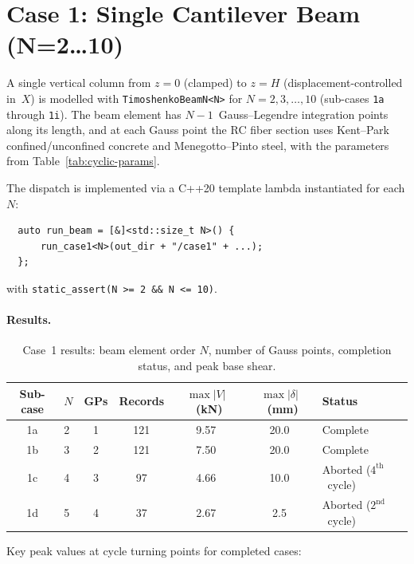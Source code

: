 \section{Case 1: Single Cantilever Beam (N=2\ldots10)}
\label{sec:cyclic-case1}

A single vertical column from $z = 0$ (clamped) to $z = H$
(displacement-controlled in~$X$) is modelled with
\texttt{TimoshenkoBeamN<N>} for $N = 2, 3, \ldots, 10$
(sub-cases \texttt{1a} through \texttt{1i}).  The beam element
has $N-1$~Gauss--Legendre integration points along its length,
and at each Gauss point the RC fiber section uses
Kent--Park confined/unconfined concrete and Menegotto--Pinto steel,
with the parameters from Table~\ref{tab:cyclic-params}.

The dispatch is implemented via a C++20 template lambda
instantiated for each $N$:
\begin{verbatim}
  auto run_beam = [&]<std::size_t N>() {
      run_case1<N>(out_dir + "/case1" + ...);
  };
\end{verbatim}
with \texttt{static\_assert(N >= 2 \&\& N <= 10)}.

\paragraph{Results.}

\begin{table}[htbp]
\centering
\caption{Case~1 results: beam element order $N$, number of Gauss
  points, completion status, and peak base shear.}
\label{tab:case1-results}
\begin{tabular}{clccccl}
\toprule
\textbf{Sub-case} & $N$ & \textbf{GPs} & \textbf{Records} &
  $\max|V|$~(kN) & $\max|\delta|$~(mm) & \textbf{Status} \\
\midrule
1a & 2 & 1 & 121 & 9.57 & 20.0 & Complete \\
1b & 3 & 2 & 121 & 7.50 & 20.0 & Complete \\
1c & 4 & 3 &  97 & 4.66 & 10.0 & Aborted ($4^{\text{th}}$~cycle) \\
1d & 5 & 4 &  37 & 2.67 & 2.5  & Aborted ($2^{\text{nd}}$~cycle) \\
\bottomrule
\end{tabular}
\end{table}

\noindent
Key peak values at cycle turning points for completed cases:

